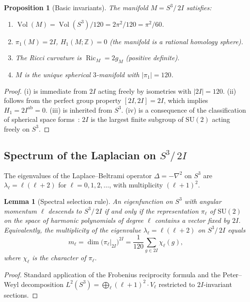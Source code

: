 \documentclass[11pt,a4paper]{article}
\theoremstyle{plain}
\newtheorem{lemma}[theorem]{Lemma}
\newtheorem{proposition}[theorem]{Proposition}
\theoremstyle{definition}
\DeclareMathOperator{\Ric}{Ric}
\DeclareMathOperator{\Vol}{Vol}
\newcommand{\Z}{\mathbb{Z}}
\newcommand{\Lap}{\Delta}                 %
\newcommand{\DS}{S^3\!/\,2I}             %
\newcommand{\BI}{2I}                      %
\newcommand{\abs}[1]{\lvert #1 \rvert}
\begin{document}
\begin{proposition}[Basic invariants]\label{prop:invariants}
The manifold $M = \DS$ satisfies:
\begin{enumerate}[nosep,label=(\roman*)]
  \item $\Vol(M) = \Vol(S^3) / 120 = 2\pi^2 / 120 = \pi^2/60$.
  \item $\pi_1(M) = \BI$,\; $H_1(M;\Z) = 0$ (the manifold is a
        rational homology sphere).
  \item The Ricci curvature is $\Ric_M = 2g_M$ (positive definite).
  \item $M$ is the unique spherical $3$-manifold with $\abs{\pi_1} = 120$.
\end{enumerate}
\end{proposition}

\begin{proof}
(i) is immediate from $\BI$ acting freely by isometries with
$\abs{\BI} = 120$.  (ii) follows from the perfect group property
$[\BI,\BI] = \BI$, which implies $H_1 = \BI^{\mathrm{ab}} = 0$.  (iii) is
inherited from $S^3$.  (iv) is a consequence of the classification of spherical
space forms~\cite{Wolf}: $\BI$ is the largest finite subgroup of $\mathrm{SU}(2)$ acting
freely on $S^3$.
\end{proof}

\subsection{Spectrum of the Laplacian on $\DS$}\label{subsec:spectrum}

The eigenvalues of the Laplace--Beltrami operator $\Lap = -\nabla^2$ on $S^3$
are $\lambda_\ell = \ell(\ell + 2)$ for $\ell = 0, 1, 2, \ldots$, with
multiplicity $(\ell+1)^2$.

\begin{lemma}[Spectral selection rule]\label{lem:specselect}
An eigenfunction on $S^3$ with angular momentum $\ell$ descends to $\DS$ if
and only if the representation $\pi_\ell$ of $\mathrm{SU}(2)$ on the space
of harmonic polynomials of degree $\ell$ contains a vector fixed by $\BI$.
Equivalently, the multiplicity of the eigenvalue $\lambda_\ell = \ell(\ell+2)$
on $\DS$ equals
\[
  m_\ell = \dim \bigl(\pi_\ell\big|_{\BI}\bigr)^{\BI}
  = \frac{1}{120} \sum_{g \in \BI} \chi_\ell(g),
\]
where $\chi_\ell$ is the character of $\pi_\ell$.
\end{lemma}

\begin{proof}
Standard application of the Frobenius reciprocity formula and the Peter--Weyl
decomposition $L^2(S^3) = \bigoplus_\ell (\ell+1)^2 \cdot V_\ell$ restricted
to $\BI$-invariant sections.
\end{proof}
\end{document}
